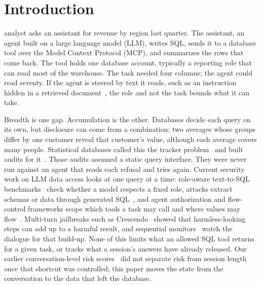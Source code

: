 \documentclass[10pt,journal,compsoc]{IEEEtran}
\begin{document}
\maketitle
\IEEEdisplaynontitleabstractindextext
\IEEEpeerreviewmaketitle

\section{Introduction}\label{sec:intro}

 analyst asks an assistant for revenue by region last quarter. The assistant, an agent built on a large language model (LLM), writes SQL, sends it to a database tool over the Model Context Protocol (MCP), and summarizes the rows that come back. The tool holds one database account, typically a reporting role that can read most of the warehouse. The task needed four columns; the agent could read seventy. If the agent is steered by text it reads, such as an instruction hidden in a retrieved document~\cite{greshake2023indirect,pedro2025p2sql}, the role and not the task bounds what it can take.

Breadth is one gap. Accumulation is the other. Databases decide each query on its own, but disclosure can come from a combination: two averages whose groups differ by one customer reveal that customer's value, although each average covers many people. Statistical databases called this the tracker problem~\cite{denning1979tracker} and built audits for it~\cite{chin1982auditing,kenthapadi2005simulatable}. Those audits assumed a static query interface. They were never run against an agent that reads each refusal and tries again. Current security work on LLM data access looks at one query at a time: role-aware text-to-SQL benchmarks~\cite{jiang2026rbacsql,rolecond2025} check whether a model respects a fixed role, attacks extract schemas or data through generated SQL~\cite{klisura2025schema,dataagents2026}, and agent authorization and flow-control frameworks scope which tools a task may call and where values may flow~\cite{authz2026agents,agenra2026,shi2025progent,debenedetti2026camel}. Multi-turn jailbreaks such as Crescendo~\cite{russinovich2025crescendo} showed that harmless-looking steps can add up to a harmful result, and sequential monitors~\cite{chen2025sequential} watch the dialogue for that build-up. None of this limits what an allowed SQL tool returns for a given task, or tracks what a session's answers have already released. Our earlier conversation-level risk scores~\cite{mishra2026cra} did not separate risk from session length once that shortcut was controlled; this paper moves the state from the conversation to the data that left the database.
\end{document}
